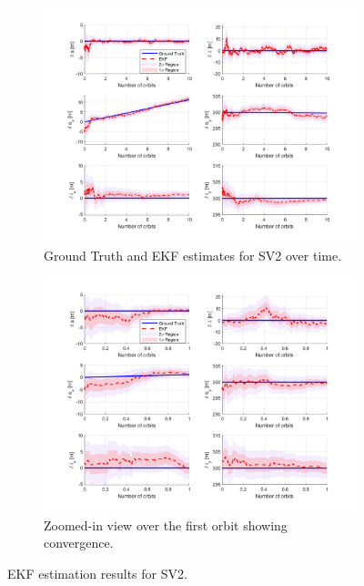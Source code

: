 \begin{figure}[H]
    \centering
    \begin{subfigure}[t]{0.49\textwidth}
        \centering
        \includegraphics[width=\linewidth]{sim/figures/PS8/ROE_over_time_SV2_comparison.png}
        \caption{Ground Truth and EKF estimates for SV2 over time.}
        \label{fig:sv2_ekf_estimates}
    \end{subfigure}
    \hfill
    \begin{subfigure}[t]{0.49\textwidth}
        \centering
        \includegraphics[width=\linewidth]{sim/figures/PS8/ROE_over_time_SV2_comparison_zoomed.png}
        \caption{Zoomed-in view over the first orbit showing convergence.}
        \label{fig:sv2_ekf_estimates_zoom}
    \end{subfigure}
    \caption{EKF estimation results for SV2.}
    \label{fig:sv2_ekf_combined}
\end{figure}

